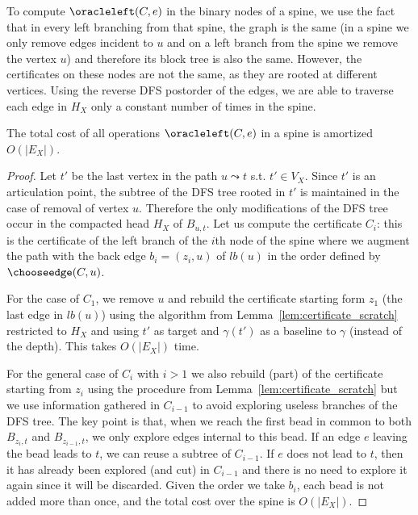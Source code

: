To compute $\oracleleft(C,e)$ in the binary nodes of a spine, we use
the fact that in every left branching from that spine, the graph is
the same (in a spine we only remove edges incident to $u$ and on a
left branch from the spine we remove the vertex $u$) and therefore its
block tree is also the same. However, the certificates on these nodes
are not the same, as they are rooted at different vertices. Using
the reverse DFS postorder of the edges, we are able to traverse
each edge in $H_X$ only a constant number of times in the spine.


\begin{lemma}
	\label{lem:promotebackedge}
	The total cost of all operations $\oracleleft(C,e)$ in a
        spine is amortized $O(|E_X|)$.
\end{lemma}
\begin{proof}
	Let $t'$ be the last vertex in the path $u \leadsto t$ s.t.
	$t' \in V_X$. Since $t'$ is an articulation point, the subtree
        of the DFS tree rooted in $t'$ is maintained in the
	case of removal of vertex $u$. Therefore the only modifications
	of the DFS tree occur in the compacted head $H_X$ of $B_{u,t}$.
Let us compute the certificate $C_i$: this is the certificate
	of the left branch of the $i$th node of the spine where we
	augment the path with the back edge $b_i = (z_i,u)$ of
	$lb(u)$ in the order defined by $\chooseedge(C,u)$.

	For the case of $C_1$, we remove $u$ and rebuild the
	certificate starting form $z_1$ (the last edge in $lb(u)$)
	using the algorithm from Lemma~\ref{lem:certificate_scratch}
	restricted to $H_X$ and using $t'$ as target and $\gamma(t')$
	as a baseline to $\gamma$ (instead of the depth). This takes
	$O(|E_X|)$ time.  

	For the general case of $C_i$ with $i>1$ we also rebuild
	(part) of the certificate starting from $z_i$ using the
	procedure from Lemma~\ref{lem:certificate_scratch} but we use
	information gathered in $C_{i-1}$ to avoid exploring useless
	branches of the DFS tree. The key point is that, when we reach
	the first bead in common to both $B_{z_i,t}$ and
	$B_{z_{i-1},t}$, we only explore edges internal to this bead.
	If an edge $e$ leaving the bead leads to $t$, we can reuse
	a subtree of $C_{i-1}$. If $e$ does not lead to $t$, then it
	has already been explored (and cut) in $C_{i-1}$ and there is
	no need to explore it again since it will be discarded.
	Given the order we take $b_i$, each bead is
	not added more than once, and the total cost over the
	spine is $O(|E_X|)$.


\end{proof}

